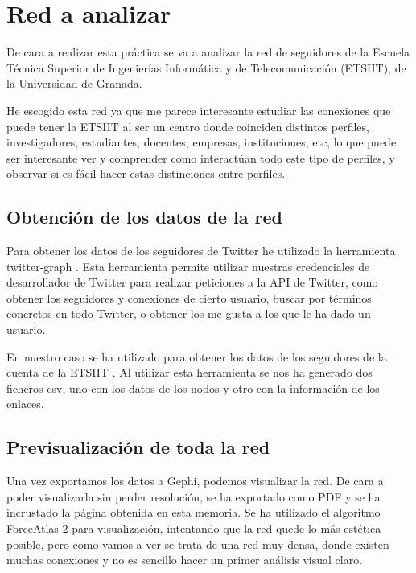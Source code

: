 \section{Red a analizar}

De cara a realizar esta práctica se va a analizar la red de seguidores de la Escuela Técnica Superior de Ingenierías Informática y de Telecomunicación (ETSIIT), de la Universidad de Granada.

He escogido esta red ya que me parece interesante estudiar las conexiones que puede tener la ETSIIT al ser un centro donde coinciden distintos perfiles, investigadores, estudiantes, docentes, empresas, instituciones, etc, lo que puede ser interesante ver y comprender como interactúan todo este tipo de perfiles, y observar si es fácil hacer estas distinciones entre perfiles.

\subsection{Obtención de los datos de la red}

Para obtener los datos de los seguidores de Twitter he utilizado la herramienta twitter-graph \cite{twitterGraph}. Esta herramienta permite utilizar nuestras credenciales de desarrollador de Twitter para realizar peticiones a la API de Twitter, como obtener los seguidores y conexiones de cierto usuario, buscar por términos concretos en todo Twitter, o obtener los me gusta a los que le ha dado un usuario.

En nuestro caso se ha utilizado para obtener los datos de los seguidores de la cuenta de la ETSIIT \cite{twitterETSIIT}. Al utilizar esta herramienta se nos ha generado dos ficheros csv, uno con los datos de los nodos y otro con la información de los enlaces.

\subsection{Previsualización de toda la red}

Una vez exportamos los datos a Gephi, podemos visualizar la red. De cara a poder visualizarla sin perder resolución, se ha exportado como PDF y se ha incrustado la página obtenida en esta memoria. Se ha utilizado el algoritmo ForceAtlas 2 para visualización, intentando que la red quede lo más estética posible, pero como vamos a ver se trata de una red muy densa, donde existen muchas conexiones y no es sencillo hacer un primer análisis visual claro.

